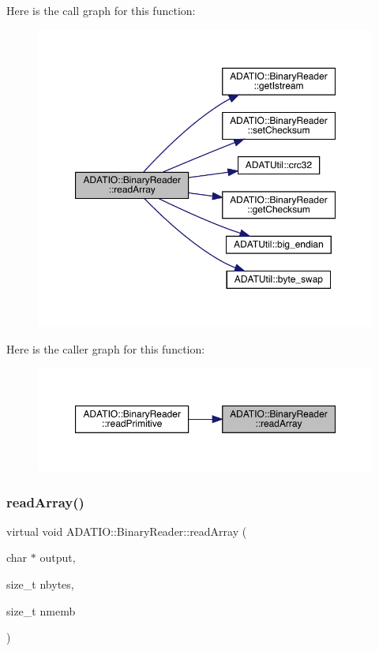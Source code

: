 Here is the call graph for this function\+:
\nopagebreak
\begin{figure}[H]
\begin{center}
\leavevmode
\includegraphics[width=350pt]{da/dd9/classADATIO_1_1BinaryReader_a9c68e2d4ecd86773a48a3a38f0c90677_cgraph}
\end{center}
\end{figure}
Here is the caller graph for this function\+:
\nopagebreak
\begin{figure}[H]
\begin{center}
\leavevmode
\includegraphics[width=350pt]{da/dd9/classADATIO_1_1BinaryReader_a9c68e2d4ecd86773a48a3a38f0c90677_icgraph}
\end{center}
\end{figure}
\mbox{\label{classADATIO_1_1BinaryReader_aba9bb1d3a6af4b6ab28388f6bd003d91}} 
\subsubsection{\texorpdfstring{readArray()}{readArray()}\hspace{0.1cm}{\footnotesize\ttfamily [2/3]}}
{\footnotesize\ttfamily virtual void A\+D\+A\+T\+I\+O\+::\+Binary\+Reader\+::read\+Array (\begin{DoxyParamCaption}\item[{char $\ast$}]{output,  }\item[{size\+\_\+t}]{nbytes,  }\item[{size\+\_\+t}]{nmemb }\end{DoxyParamCaption})\hspace{0.3cm}{\ttfamily [virtual]}}



